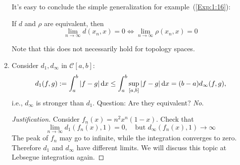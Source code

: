 \begin{example}
\begin{enumerate}
It's easy to conclude the simple generalization for example~(\ref{Exp:1:16}):
\begin{proposition}
If $d$ and $\rho$ are equivalent, then 
\[
\lim_{n\to\infty}d(x_n,x)=0\Longleftrightarrow
\lim_{n\to\infty}\rho(x_n,x)=0
\]
\end{proposition}
Note that this does not necessarily hold for topology spaces.
\item
Consider $d_1,d_\infty$ in $\mathcal{C}[a,b]$:
\[
d_1(f,g):=\int_a^b|f-g|\,\mathrm{d} x\le
\int_a^b\sup_{[a,b]}|f-g|\,\mathrm{d} x=(b-a)d_\infty(f,g),
\]
i.e., $d_\infty$ is stronger than $d_1$. Question: Are they equivalent? \emph{No}.
\begin{proof}[Justification]
Consider $f_n(x)=n^2x^n(1-x)$. Check that
\[
\lim_{n\to\infty}d_1(f_n(x),1)=0,\quad
\mbox{but }d_\infty(f_n(x),1)\to\infty
\]
The peak of $f_n$ may go to infinite, while the integration converges to zero. Therefore $d_1$ and $d_\infty$ have different limits. We will discuss this topic at Lebsegue integration again.
\end{proof}
\end{enumerate}
\end{example}
